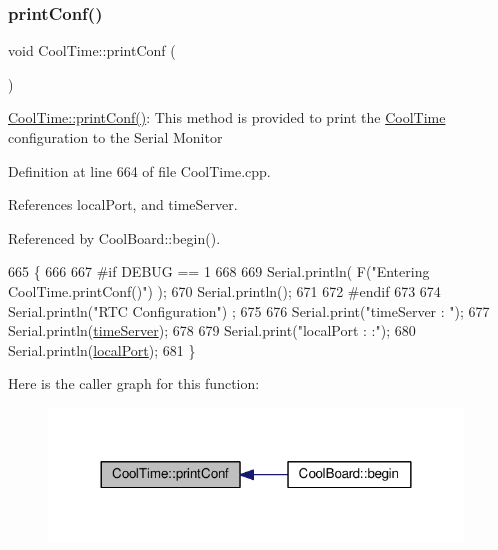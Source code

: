\subsubsection{\texorpdfstring{print\+Conf()}{printConf()}}
{\footnotesize\ttfamily void Cool\+Time\+::print\+Conf (\begin{DoxyParamCaption}{ }\end{DoxyParamCaption})}

\hyperlink{classCoolTime_af355e7f9b3898211cd2ff25eab5933b1}{Cool\+Time\+::print\+Conf()}\+: This method is provided to print the \hyperlink{classCoolTime}{Cool\+Time} configuration to the Serial Monitor 

Definition at line 664 of file Cool\+Time.\+cpp.



References local\+Port, and time\+Server.



Referenced by Cool\+Board\+::begin().


\begin{DoxyCode}
665 \{
666 
667 \textcolor{preprocessor}{#if DEBUG == 1}
668 
669     Serial.println( F(\textcolor{stringliteral}{"Entering CoolTime.printConf()"}) );
670     Serial.println();
671 
672 \textcolor{preprocessor}{#endif }
673 
674     Serial.println(\textcolor{stringliteral}{"RTC Configuration"}) ;
675 
676     Serial.print(\textcolor{stringliteral}{"timeServer : "});
677     Serial.println(\hyperlink{classCoolTime_ad2b9858f399108cb440dd1e908916f04}{timeServer});
678     
679     Serial.print(\textcolor{stringliteral}{"localPort : :"});
680     Serial.println(\hyperlink{classCoolTime_a2f777da44d7ba678be8185299e9b49d1}{localPort});
681 \}
\end{DoxyCode}
Here is the caller graph for this function\+:
\nopagebreak
\begin{figure}[H]
\begin{center}
\leavevmode
\includegraphics[width=312pt]{classCoolTime_af355e7f9b3898211cd2ff25eab5933b1_icgraph}
\end{center}
\end{figure}
\mbox{\label{classCoolTime_ae9658c9b377510d469e3b88edf33ee85}} 
